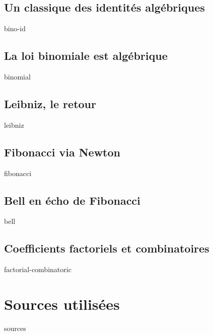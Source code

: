 \documentclass[12pt]{amsart}
\begin{document}
    \subsection{Un classique des identités algébriques}
    
    {bino-id}


    \subsection{La loi binomiale est algébrique}
    
    {binomial}
    
    
    \subsection{Leibniz, le retour}
    
    {leibniz}
    
    
    \subsection{Fibonacci via Newton}
    
    {fibonacci}
    
    
    \subsection{Bell en écho de Fibonacci} \label{newton-fibo}
    
    {bell}
    
    
    \subsection{Coefficients factoriels et combinatoires}
    
    {factorial-combinatoric}




\section{Sources utilisées}

	{sources}
\end{document}
